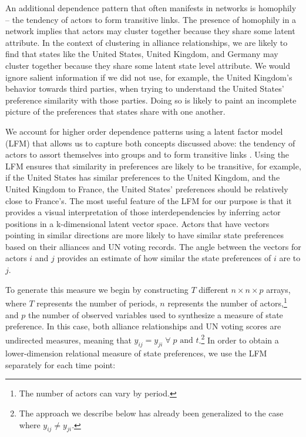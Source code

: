 An additional dependence pattern that often manifests in networks is homophily -- the tendency of actors to form transitive links. The presence of homophily in a network implies that actors may cluster together because they share some latent attribute. In the context of clustering in alliance relationships, we are likely to find that states like the United States, United Kingdom, and Germany may cluster together because they share some latent state level attribute. We would ignore salient information if we did not use, for example, the United Kingdom's behavior towards third parties, when trying to understand the United States' preference similarity with those parties. Doing so is likely to paint an incomplete picture of the preferences that states share with one another.

We account for higher order dependence patterns using a latent factor model (LFM) that allows us to capture both concepts discussed above: the tendency of actors to assort themselves into groups and to form transitive links \citep{hoff:2007,minhas:etal:2016:arxiv}. Using the LFM ensures that similarity in preferences are likely to be transitive, for example, if the United States has similar preferences to the United Kingdom, and the United Kingdom to France, the United States' preferences should be relatively close to France's. The most useful feature of the LFM for our purpose is that it provides a visual interpretation of those interdependencies by inferring actor positions in a k-dimensional latent vector space. Actors that have vectors pointing in similar directions are more likely to have similar state preferences based on their alliances and UN voting records. The angle between the vectors for actors $i$ and $j$ provides an estimate of how similar the state preferences of $i$ are to $j$. 

To generate this measure we begin by constructing $T$ different $n \times n \times p$ arrays, where $T$ represents the number of periods, $n$ represents the number of actors,\footnote{The number of actors can vary by period.} and $p$ the number of observed variables used to synthesize a measure of state preference. In this case, both alliance relationships and UN voting scores are undirected measures, meaning that $y_{ij} = y_{ji} \; \forall \; p \text{ and } t$.\footnote{The approach we describe below has already been generalized to the case where $y_{ij} \neq y_{ji}$.} In order to obtain a lower-dimension relational measure of state preferences, we use the LFM separately for each time point: 


